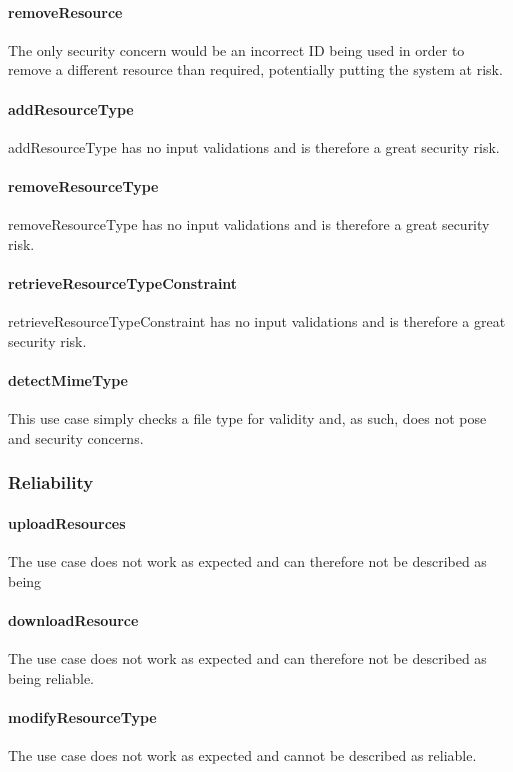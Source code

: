 \documentclass[a4paper]{article}
\begin{document}
\paragraph{removeResource}
The only security concern would be an incorrect ID being used in order to remove a different resource than required, potentially putting the system at risk.

\paragraph{addResourceType}
addResourceType has no input validations and is therefore a great security risk.

\paragraph{removeResourceType}
removeResourceType has no input validations and is therefore a great security risk.

\paragraph{retrieveResourceTypeConstraint}
retrieveResourceTypeConstraint has no input validations and is therefore a great security risk.

\paragraph{detectMimeType}
This use case simply checks a file type for validity and, as such, does not pose and security concerns.

\subsubsection {Reliability}

\paragraph{uploadResources}
The use case does not work as expected and can therefore not be described as being 

\paragraph{downloadResource}
The use case does not work as expected and can therefore not be described as being 
reliable. 

\paragraph{modifyResourceType}
The use case does not work as expected and cannot be described as reliable.
\end{document}
